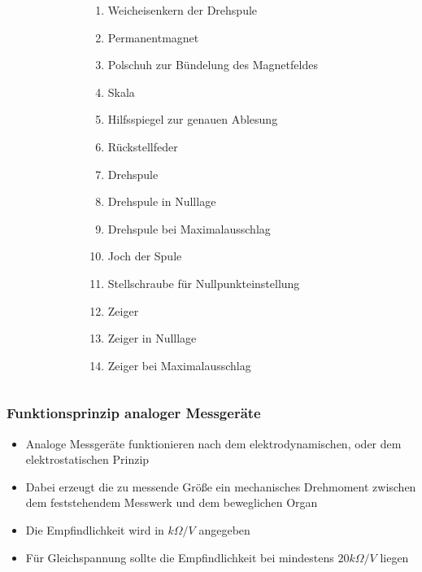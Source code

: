 \begin{frame}
\begin{columns}
\begin{figure}
    \end{figure}
    \begin{footnotesize}
      \begin{enumerate}
        \item Weicheisenkern der Drehspule
        \item Permanentmagnet
        \item Polschuh zur Bündelung des Magnetfeldes
        \item Skala
        \item Hilfsspiegel zur genauen Ablesung
        \item Rückstellfeder
        \item Drehspule
        \item Drehspule in Nulllage
        \item Drehspule bei Maximalausschlag
        \item Joch der Spule
        \item Stellschraube für Nullpunkteinstellung
        \item Zeiger
        \item Zeiger in Nulllage
        \item Zeiger bei Maximalausschlag
      \end{enumerate}
    \end{footnotesize}
  \end{columns}
\end{frame}

\begin{frame}
  \frametitle{Funktionsprinzip analoger Messgeräte}
  \begin{itemize}
    \item Analoge Messgeräte funktionieren nach dem elektrodynamischen, oder dem elektrostatischen Prinzip
    \item Dabei erzeugt die zu messende Größe ein mechanisches Drehmoment zwischen dem feststehendem Messwerk und dem beweglichen Organ
    \item Die Empfindlichkeit wird in $k \Omega /V$ angegeben
    \item Für Gleichspannung sollte die Empfindlichkeit bei mindestens $20 k \Omega / V$ liegen
  \end{itemize}
\end{frame}


